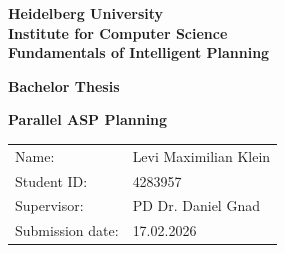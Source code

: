 \documentclass[
     11pt,                    %
     a4paper,             %
     BCOR=10mm,     %
     DIV=14,                 %
     listof=totoc,                    %
     bibliography=totoc,       %
     index=totoc,              %
     parskip            %
     twoside,
     headsepline
     ]{scrreprt}
\theoremstyle{definition}
\theoremstyle{definition}
\theoremstyle{remark}
\theoremstyle{bfnote}
\begin{document}
\begin{titlepage}


\vspace*{1cm}
\begin{center}
\textbf{ 
\Large Heidelberg University\\
\smallskip
\Large Institute for Computer Science\\
\Large Fundamentals of Intelligent Planning \\
\smallskip
}

\vspace{3cm}

\textbf{\large Bachelor Thesis}

\vspace{0.5\baselineskip}
{\Huge
\textbf{Parallel ASP Planning}
}
\end{center}

\vfill 

{\large
\begin{tabular}[l]{ll}
Name: & Levi Maximilian Klein\\
Student ID: & 4283957\\
Supervisor: & PD Dr. Daniel Gnad\\
Submission date: & 17.02.2026
\end{tabular}
}

\end{titlepage}

\cleardoublepage
\end{document}

